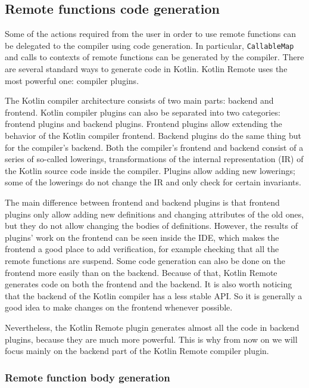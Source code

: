 \documentclass[a4paper,11pt,oneside]{article}
\newcommand{\kotlini}[1]{\texttt{#1}}
\begin{document}
\subsection{Remote functions code generation}\label{remote_functions_code_generation}

Some of the actions required from the user in order to use remote functions can be delegated to the
compiler using code generation. In particular, \kotlini{CallableMap} and calls to contexts of remote functions
can be generated by the compiler. There are several standard ways to generate code in Kotlin. Kotlin
Remote uses the most powerful one: compiler plugins.

The Kotlin compiler architecture consists of two main parts: backend and frontend. Kotlin compiler
plugins can also be separated into two categories: frontend plugins and backend plugins. Frontend
plugins allow extending the behavior of the Kotlin compiler frontend. Backend plugins do the same thing
but for the compiler's backend. Both the compiler's frontend and backend consist of a series of so-called lowerings,
transformations of the internal representation (IR) of the Kotlin source code inside the compiler. Plugins allow adding
new lowerings; some of the lowerings do not change the IR and only check for certain invariants.

The main difference between frontend and backend plugins is that frontend plugins only allow adding
new definitions and changing attributes of the old ones, but they do not allow changing the bodies of definitions.
However, the results of plugins' work on the frontend can be seen inside the IDE, which makes the frontend a good place to
add verification, for example checking that all the remote functions are suspend. Some code generation can
also be done on the frontend more easily than on the backend. Because of that, Kotlin Remote generates code on both the frontend
and the backend. It is also worth noticing that the backend of the Kotlin compiler has a less stable API. So
it is generally a good idea to make changes on the frontend whenever possible.

Nevertheless, the Kotlin Remote plugin generates almost all the code in backend plugins, because they are
much more powerful. This is why from now on we will focus mainly on the backend part of the Kotlin Remote
compiler plugin.

\subsubsection{Remote function body generation}
\end{document}

